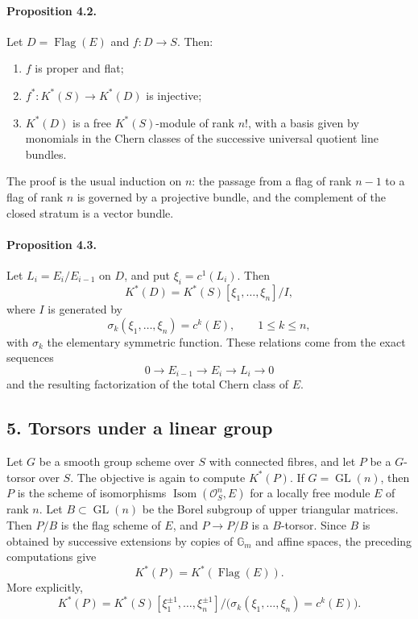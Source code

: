 \documentclass[12pt]{article}
\newcommand{\GG}{\mathbb G}
\newcommand{\cO}{\mathcal O}
\newcommand{\Gl}{\operatorname{GL}}
\newcommand{\Isom}{\operatorname{Isom}}
\newcommand{\Drap}{\operatorname{Flag}}
\begin{document}
\paragraph{Proposition 4.2.}
Let $D=\Drap(E)$ and $f:D\to S$. Then:
\begin{enumerate}[label=\roman*)]
\item $f$ is proper and flat;
\item $f^*:K^*(S)\to K^*(D)$ is injective;
\item $K^*(D)$ is a free $K^*(S)$-module of rank $n!$, with a basis given by monomials in the Chern classes of the successive universal quotient line bundles.
\end{enumerate}
The proof is the usual induction on $n$: the passage from a flag of rank $n-1$ to a flag of rank $n$ is governed by a projective bundle, and the complement of the closed stratum is a vector bundle.

\paragraph{Proposition 4.3.}
Let $L_i=E_i/E_{i-1}$ on $D$, and put $\xi_i=c^1(L_i)$. Then
\[
K^*(D)=K^*(S)[\xi_1,\ldots,\xi_n]/I,
\]
where $I$ is generated by
\[
\sigma_k(\xi_1,\ldots,\xi_n)=c^k(E),\qquad 1\leq k\leq n,
\]
with $\sigma_k$ the elementary symmetric function. These relations come from the exact sequences
\[
0\to E_{i-1}\to E_i\to L_i\to0
\]
and the resulting factorization of the total Chern class of $E$.

\subsection*{5. Torsors under a linear group}

Let $G$ be a smooth group scheme over $S$ with connected fibres, and let $P$ be a $G$-torsor over $S$. The objective is again to compute $K^*(P)$. If $G=\Gl(n)$, then $P$ is the scheme of isomorphisms $\Isom(\cO_S^n,E)$ for a locally free module $E$ of rank $n$. Let $B\subset\Gl(n)$ be the Borel subgroup of upper triangular matrices. Then $P/B$ is the flag scheme of $E$, and $P\to P/B$ is a $B$-torsor. Since $B$ is obtained by successive extensions by copies of $\GG_m$ and affine spaces, the preceding computations give
\[
K^*(P)=K^*(\Drap(E)).
\]
More explicitly,
\[
K^*(P)=K^*(S)[\xi_1^{\pm1},\ldots,\xi_n^{\pm1}]/\bigl(\sigma_k(\xi_1,\ldots,\xi_n)=c^k(E)\bigr).
\]
\end{document}
